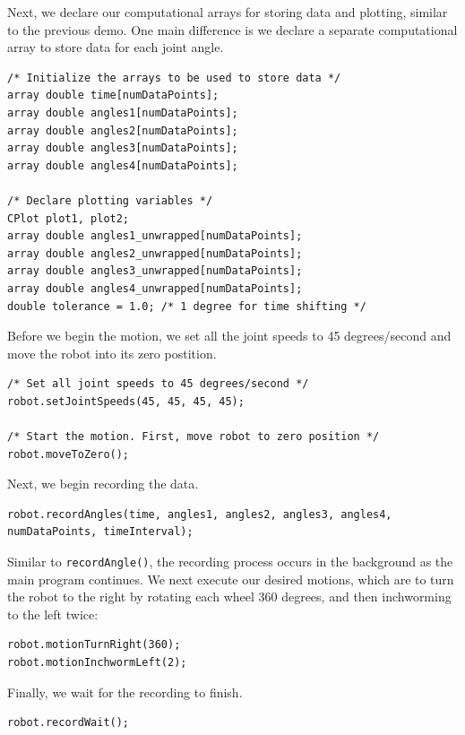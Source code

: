 \documentclass{article}
\begin{document}
Next, we declare our computational arrays for storing data and plotting, similar to 
the previous demo. One main difference is we declare a separate computational array
to store data for each joint angle.
\begin{verbatim}
/* Initialize the arrays to be used to store data */
array double time[numDataPoints];
array double angles1[numDataPoints];
array double angles2[numDataPoints];
array double angles3[numDataPoints];
array double angles4[numDataPoints];

/* Declare plotting variables */
CPlot plot1, plot2;
array double angles1_unwrapped[numDataPoints];
array double angles2_unwrapped[numDataPoints];
array double angles3_unwrapped[numDataPoints];
array double angles4_unwrapped[numDataPoints];
double tolerance = 1.0; /* 1 degree for time shifting */
\end{verbatim}

Before we begin the motion, we set all the joint speeds to 45 degrees/second
and move the robot into its zero postition.
\begin{verbatim}
/* Set all joint speeds to 45 degrees/second */
robot.setJointSpeeds(45, 45, 45, 45);

/* Start the motion. First, move robot to zero position */
robot.moveToZero();
\end{verbatim}

Next, we begin recording the data.
\begin{verbatim}
robot.recordAngles(time, angles1, angles2, angles3, angles4, numDataPoints, timeInterval);
\end{verbatim}

Similar to \texttt{recordAngle()}, the recording process occurs in the background as
the main program continues. We next execute our desired motions, which are to turn the
robot to the right by rotating each wheel 360 degrees, and then inchworming to
the left twice:
\begin{verbatim}
robot.motionTurnRight(360);
robot.motionInchwormLeft(2);
\end{verbatim}

Finally, we wait for the recording to finish.
\begin{verbatim}
robot.recordWait();
\end{verbatim}
\end{document}
